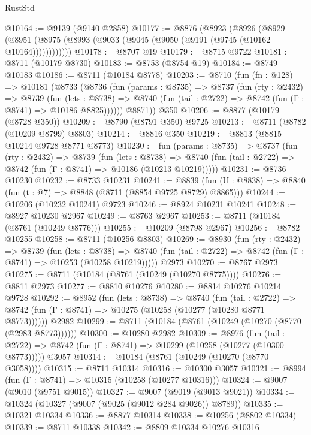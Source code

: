 \begin{lexlean}{RustStd}
\begin{coremodule}
@10164 := @9139 (@9140 @2858)
@10177 := @8876
    (@8923
      (@8926
        (@8929 (@8951 (@8975 (@8993 (@9033 (@9045 (@9050 (@9191 (@9745 (@10162 @10164))))))))))))
@10178 := @8707 @19
@10179 := @8715 @9722
@10181 := @8711 (@10179 @8730)
@10183 := @8753 (@8754 @19)
@10184 := @8749 @10183
@10186 := @8711 (@10184 @8778)
@10203 := @8710
    (fun (fn : @128) =>
    @10181
      (@8733
        (@8736
          (fun (params : @8735) =>
          @8737
            (fun (rty : @2432) =>
            @8739
              (fun (lets : @8738) =>
              @8740 (fun (tail : @2722) => @8742 (fun (Γ : @8741) => @10186 @8825))))))
        @8871))
    @350
@10206 := @8877 (@10179 (@8728 @350))
@10209 := @8790 (@8791 @350) @9725
@10213 := @8711 (@8782 (@10209 @8799) @8803)
@10214 := @8816 @350
@10219 := @8813 (@8815 @10214 @9728 @8771 @8773)
@10230 := fun (params : @8735) =>
  @8737
    (fun (rty : @2432) =>
    @8739
      (fun (lets : @8738) =>
      @8740 (fun (tail : @2722) => @8742 (fun (Γ : @8741) => @10186 (@10213 @10219)))))
@10231 := @8736 @10230
@10232 := @8733 @10231
@10241 := @8839 (fun (U : @8838) => @8840 (fun (t : @7) => @8848 (@8711 (@8854 @9725 @8729) @8865)))
@10244 := @10206 (@10232 @10241) @9723
@10246 := @8924 @10231 @10241
@10248 := @8927 @10230 @2967
@10249 := @8763 @2967
@10253 := @8711 (@10184 (@8761 (@10249 @8776)))
@10255 := @10209 (@8798 @2967)
@10256 := @8782 @10255
@10258 := @8711 (@10256 @8803)
@10269 := @8930
    (fun (rty : @2432) =>
    @8739
      (fun (lets : @8738) =>
      @8740 (fun (tail : @2722) => @8742 (fun (Γ : @8741) => @10253 (@10258 @10219)))))
    @2973
@10270 := @8767 @2973
@10275 := @8711 (@10184 (@8761 (@10249 (@10270 @8775))))
@10276 := @8811 @2973
@10277 := @8810 @10276
@10280 := @8814 @10276 @10214 @9728
@10292 := @8952
    (fun (lets : @8738) =>
    @8740
      (fun (tail : @2722) =>
      @8742 (fun (Γ : @8741) => @10275 (@10258 (@10277 (@10280 @8771 @8773))))))
    @2982
@10299 := @8711 (@10184 (@8761 (@10249 (@10270 (@8770 (@2983 @8773))))))
@10300 := @10280 @2982
@10309 := @8976
    (fun (tail : @2722) => @8742 (fun (Γ : @8741) => @10299 (@10258 (@10277 (@10300 @8773)))))
    @3057
@10314 := @10184 (@8761 (@10249 (@10270 (@8770 @3058))))
@10315 := @8711 @10314
@10316 := @10300 @3057
@10321 := @8994 (fun (Γ : @8741) => @10315 (@10258 (@10277 @10316)))
@10324 := @9007 (@9010 (@9751 @9015))
@10327 := @9007 (@9019 (@9013 @9021))
@10334 := @10324 (@10327 (@9007 (@9025 (@9012 @284 @9026)) @8789))
@10335 := @10321 @10334
@10336 := @8877 @10314
@10338 := @10256 (@8802 @10334)
@10339 := @8711 @10338
@10342 := @8809 @10334 @10276 @10316

\end{coremodule}
\end{lexlean}
